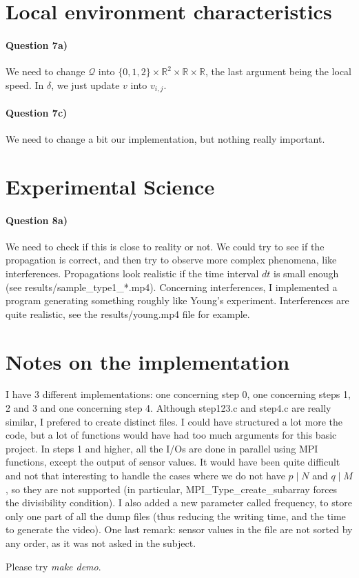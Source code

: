 \documentclass[a4paper,12pt]{article}
\begin{document}
\section{Local environment characteristics}

\paragraph{Question 7a)} We need to change $\mathcal{Q}$ into $\{0,1,2\} \times \mathbb{R}^2 \times \mathbb{R} \times \mathbb{R}$, the last argument being the local speed. In $\delta$, we just update $v$ into $v_{i,j}$.

\paragraph{Question 7c)} We need to change a bit our implementation, but nothing really important. 

\section{Experimental Science}

\paragraph{Question 8a)} We need to check if this is close to reality or not. We could try to see if the propagation is correct, and then try to observe more complex phenomena, like interferences. Propagations look realistic if the time interval $dt$ is small enough (see results/sample\_type1\_*.mp4). Concerning interferences, I implemented a program generating something roughly like Young's experiment. Interferences are quite realistic, see the results/young.mp4 file for example.

\section{Notes on the implementation}

I have 3 different implementations: one concerning step 0, one concerning steps 1, 2 and 3 and one concerning step 4. Although step123.c and step4.c are really similar, I prefered to create distinct files. I could have structured a lot more the code, but a lot of functions would have had too much arguments for this basic project. In steps 1 and higher, all the I/Os are done in parallel using MPI functions, except the output of sensor values. It would have been quite difficult and not that interesting to handle the cases where we do not have $p \mid N$ and $q \mid M$, so they are not supported (in particular, MPI\_Type\_create\_subarray forces the divisibility condition). I also added a new parameter called frequency, to store only one part of all the dump files (thus reducing the writing time, and the time to generate the video). One last remark: sensor values in the file are not sorted by any order, as it was not asked in the subject.
\par Please try \textit{make demo}.
\end{document}
